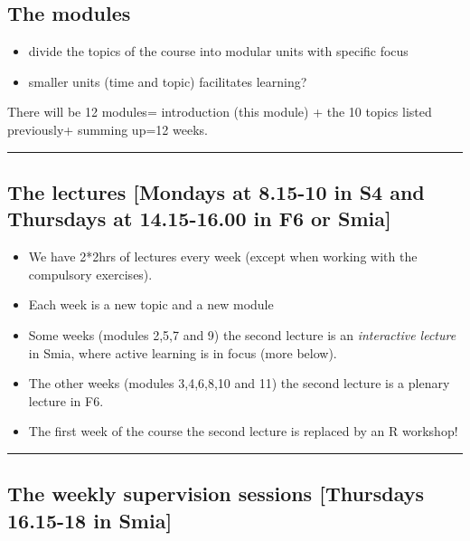 \documentclass[]{article}
\providecommand{\tightlist}{%
  \setlength{\itemsep}{0pt}\setlength{\parskip}{0pt}}
\begin{document}
\hypertarget{the-modules}{%
\subsection{The modules}\label{the-modules}}

\begin{itemize}
\tightlist
\item
  divide the topics of the course into modular units with specific focus
\item
  smaller units (time and topic) facilitates learning?
\end{itemize}

There will be 12 modules= introduction (this module) + the 10 topics
listed previously+ summing up=12 weeks.

\begin{center}\rule{0.5\linewidth}{\linethickness}\end{center}

\hypertarget{the-lectures-mondays-at-8.15-10-in-s4-and-thursdays-at-14.15-16.00-in-f6-or-smia}{%
\subsection{The lectures {[}Mondays at 8.15-10 in S4 and Thursdays at
14.15-16.00 in F6 or
Smia{]}}\label{the-lectures-mondays-at-8.15-10-in-s4-and-thursdays-at-14.15-16.00-in-f6-or-smia}}

\begin{itemize}
\tightlist
\item
  We have 2*2hrs of lectures every week (except when working with the
  compulsory exercises).
\item
  Each week is a new topic and a new module
\item
  Some weeks (modules 2,5,7 and 9) the second lecture is an
  \emph{interactive lecture} in Smia, where active learning is in focus
  (more below).
\item
  The other weeks (modules 3,4,6,8,10 and 11) the second lecture is a
  plenary lecture in F6.
\item
  The first week of the course the second lecture is replaced by an R
  workshop!
\end{itemize}

\begin{center}\rule{0.5\linewidth}{\linethickness}\end{center}

\hypertarget{the-weekly-supervision-sessions-thursdays-16.15-18-in-smia}{%
\subsection{The weekly supervision sessions {[}Thursdays 16.15-18 in
Smia{]}}\label{the-weekly-supervision-sessions-thursdays-16.15-18-in-smia}}
\end{document}
